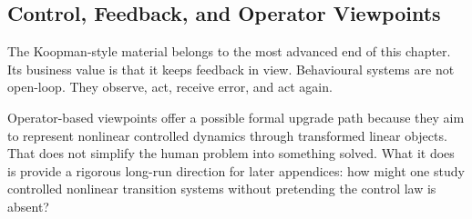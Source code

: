 \subsection{Control, Feedback, and Operator Viewpoints}

The Koopman-style material belongs to the most advanced end of this chapter.
Its business value is that it keeps feedback in view. Behavioural systems are
not open-loop. They observe, act, receive error, and act again.

\begin{discussion}
Operator-based viewpoints offer a possible formal upgrade path because they aim
to represent nonlinear controlled dynamics through transformed linear objects.
That does not simplify the human problem into something solved. What it does is
provide a rigorous long-run direction for later appendices: how might one study
controlled nonlinear transition systems without pretending the control law is
absent?
\end{discussion}
